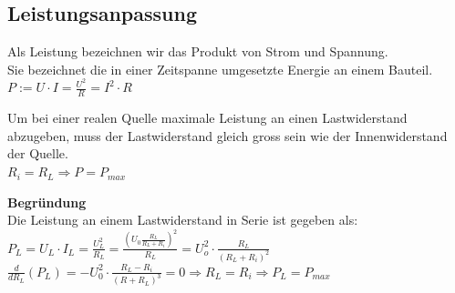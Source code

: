 										\subsection{Leistungsanpassung}
										\beginip
											Als Leistung bezeichnen wir das Produkt von Strom und Spannung. \\
											Sie bezeichnet die in einer Zeitspanne umgesetzte Energie an einem Bauteil. \\
											\formulaBegin
											$\displaystyle P := U \cdot I = \frac{U^2}{R} = I^2 \cdot R $
											\formulaEnd
										\iend

										\beginip
										Um bei einer realen Quelle maximale Leistung an einen Lastwiderstand abzugeben, muss der Lastwiderstand gleich gross sein wie der Innenwiderstand der Quelle. \\
										\formulaBegin
										$ R_i = R_L \Rightarrow P = P_{max}$
										\formulaEnd
										\begin{center}
										\end{center}
										\iend

					\newpage
										\textbf{Begründung} \\
										Die Leistung an einem Lastwiderstand in Serie ist gegeben als: \\
										$ \displaystyle P_L = U_L \cdot I_L = \frac{U_L^2}{R_L} = \frac{( U_0 \frac{R_L}{R_L + R_i})^2}{R_L} = U_o^2 \cdot \frac{R_L}{(R_L + R_i)^2}$ \\
										$\displaystyle \frac{d}{dR_L} (P_L) = - U_0^2 \cdot \frac{R_L - R_i}{(R + R_L)^3} = 0 \Rightarrow R_L = R_i  \Rightarrow P_L = P_{max}$





















